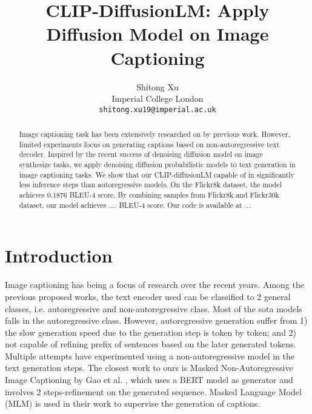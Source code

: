 \documentclass{article}
\title{CLIP-DiffusionLM: Apply Diffusion Model on Image Captioning
}
\author{
  Shitong Xu \\
  Imperial College London \\
  \texttt{shitong.xu19@imperial.ac.uk} \\
}
\begin{document}
\maketitle


\begin{abstract}
Image captioning task has been extensively researched on by previous work. However, limited experiments focus on generating captions based on non-autoregressive text decoder. Inspired by the recent success of denoising diffusion model on image synthesize tasks, we apply denoising diffusion probabilistic models to text generation in image captioning tasks. We show that our CLIP-diffusionLM capable of in significantly less inference steps than autoregressive models. On the Flickr8k dataset, the model achieves 0.1876 BLEU-4 score. By combining samples from Flickr8k and Flickr30k dataset, our model achieves .... BLEU-4 score. Our code is available at ...
\end{abstract}


\section{Introduction}
Image captioning has being a focus of research over the recent years. Among the previous proposed works, the text encoder used can be classified to 2 general classes, i.e. autoregressive and non-autoregressive class. Most of the sota models falls in the autoregressive class\cite{https://doi.org/10.48550/arxiv.1412.6632,DBLP:journals/corr/XuBKCCSZB15,DBLP:journals/corr/LuXPS16,image-caption-with-pos,mplug}. However, autoregressive generation suffer from 1) the slow generation speed due to the generation step is token by token; and 2) not capable of refining prefix of sentences based on the later generated tokens. Multiple attempts have experimented using a non-autoregressive model in the text generation steps\cite{masked-non-autoregres, partial-autoregressive, semi-autoregressive}. The closest work to ours is Masked Non-Autoregressive Image Captioning by Gao et al. \cite{masked-non-autoregres}, which uses a BERT model as generator and involves 2 steps-refinement on the generated sequence. Masked Language Model (MLM) is used in their work to supervise the generation of captions.
\end{document}
